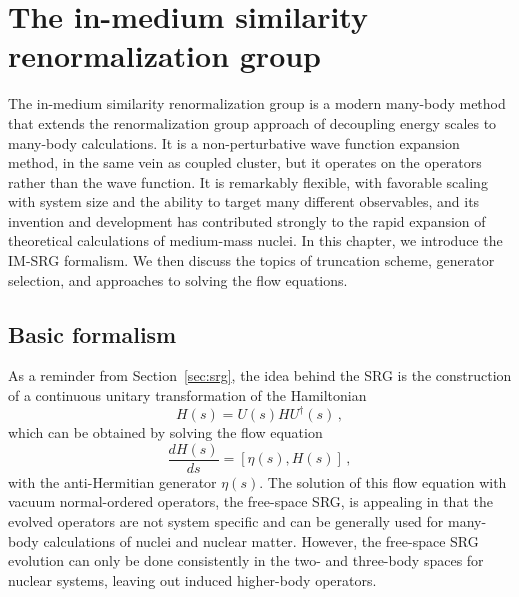 \chapter{The in-medium similarity renormalization group}\label{ch:imsrg}

The in-medium similarity renormalization group
is a modern \abinitio{} many-body method
that extends the renormalization group approach of decoupling energy scales
to many-body calculations.
It is a non-perturbative wave function expansion method,
in the same vein as coupled cluster,
but it operates on the operators rather than the wave function.
It is remarkably flexible,
with favorable scaling with system size
and the ability to target many different observables,
and its invention and development has contributed strongly
to the rapid expansion of \abinitio{} theoretical calculations of medium-mass nuclei.
In this chapter, we introduce the IM-SRG formalism.
We then discuss the topics of truncation scheme, generator selection,
and approaches to solving the flow equations.

\section{Basic formalism}

As a reminder from Section~\ref{sec:srg},
the idea behind the SRG is
the construction of a continuous unitary transformation of the Hamiltonian
\begin{equation}
  H(s) = U(s) H U^{\dagger}(s)\,,
\end{equation}
which can be obtained by solving the flow equation
\begin{equation}\label{eq:srg_flow_equation_imsrg}
  \frac{d H(s)}{ds} = [\eta(s), H(s)]\,,
\end{equation}
with the anti-Hermitian generator $\eta(s)$.
The solution of this flow equation with vacuum normal-ordered operators,
the free-space SRG,
is appealing in that the evolved operators are not system specific
and can be generally used for many-body calculations of nuclei and nuclear matter.
However, the free-space SRG evolution can only be done consistently
in the two- and three-body spaces for nuclear systems,
leaving out induced higher-body operators.

